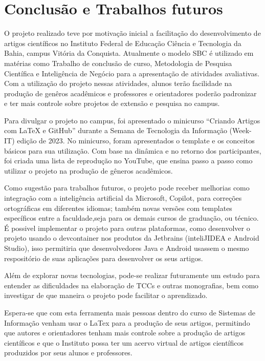 \section{Conclusão e Trabalhos futuros}

O projeto realizado teve por motivação inicial a facilitação do desenvolvimento de artigos científicos no Instituto Federal de Educação Ciência e Tecnologia da Bahia, campus Vitória da Conquista. Atualmente o modelo SBC é utilizado em matérias como Trabalho de conclusão de curso, Metodologia de Pesquisa Científica e Inteligência de Negócio para a apresentação de atividades avaliativas. Com a utilização do projeto nessas atividades, alunos terão facilidade na produção de genêros acadêmicos e professores e orientadores poderão padronizar e ter mais controle sobre projetos de extensão e pesquisa no campus.

Para divulgar o projeto no campus, foi apresentado o minicurso ``Criando Artigos com LaTeX e GitHub'' durante a Semana de Tecnologia da Informação (Week-IT) edição de 2023. No minicurso, foram apresentados o template e os conceitos básicos para sua utilização. Com base na dinâmica e no retorno dos participantes, foi criada uma lista de reprodução no YouTube, que ensina passo a passo como utilizar o projeto na produção de gêneros acadêmicos.

Como sugestão para trabalhos futuros, o projeto pode receber melhorias como integração com a inteligência artificial da Microsoft, Copilot, para correções ortográficas em diferentes idiomas; também novas versões com templates específicos entre a faculdade,seja para os demais cursos de graduação, ou técnico. É possivel implementar o projeto para outras plataformas, como desenvolver o projeto usando o devcontainer nos produtos da Jetbrains (inteliJIDEA e Android Studio), isso permitiria que desenvolvedores Java e Android usassem o mesmo respositório de suas aplicações para desenvolver os seus artigos.

Além de explorar novas tecnologias, pode-se realizar futuramente um estudo para entender as dificuldades na elaboração de TCCs e outras monografias, bem como investigar de que maneira o projeto pode facilitar o aprendizado.

Espera-se que com esta ferramenta mais pessoas dentro do curso de Sistemas de Informação venham usar o LaTex para a produção de seus artigos, permitindo que autores e orientadores tenham mais controle sobre a produção de artigos científicos e que o Instituto possa ter um acervo virtual de artigos científicos produzidos por seus alunos e professores.